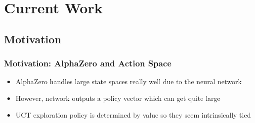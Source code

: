 \documentclass{beamer}
\begin{document}

\section{Current Work}

\subsection{Motivation}


\begin{frame}
  \frametitle{Motivation: AlphaZero and Action Space}

  \begin{itemize}
    \item AlphaZero handles large state spaces really well due to the neural network
    \item However, network outputs a policy vector which can get quite large
    \item UCT exploration policy is determined by value so they seem intrinsically tied
  \end{itemize}
\end{frame}


\end{document}
